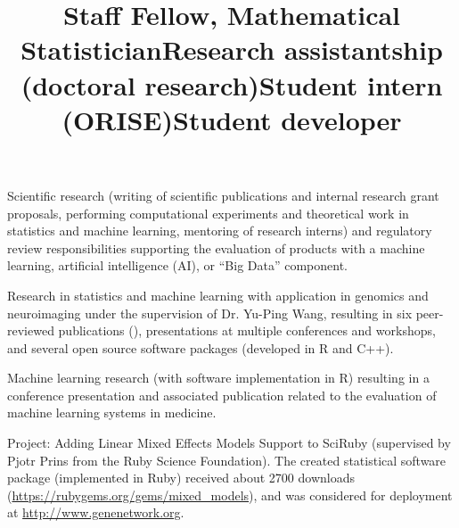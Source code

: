 \documentclass[overlapped, line, 10pt]{res} %
\begin{document}
\begin{resume}
\title{Staff Fellow, Mathematical Statistician}
\begin{position}
  Scientific research (writing of scientific publications and internal research grant proposals, performing computational experiments and theoretical work in statistics and machine learning, mentoring of research interns) and regulatory review responsibilities supporting the evaluation of products with a machine learning, artificial intelligence (AI), or ``Big Data'' component.
\end{position}

\title{Research assistantship (doctoral research)}
\begin{position}
  Research in statistics and machine learning with application in genomics and neuroimaging under the supervision of Dr. Yu-Ping Wang, resulting in six peer-reviewed publications (\cite{gossmann2015, cao2015BCB, cao2015bioinformatics, Gossmann2017-yu, Gossmann2017-ln, brzyski2016}), presentations at multiple conferences and workshops, and several open source software packages (developed in R and C++).
\end{position}

\title{Student intern (ORISE)}
\begin{position}
  Machine learning research (with software implementation in R) resulting in a conference presentation and associated publication \cite{gossmann2018} related to the evaluation of machine learning systems in medicine.
\end{position}

\title{Student developer}
\begin{position}
  Project: Adding Linear Mixed Effects Models Support to SciRuby (supervised by Pjotr Prins from the Ruby Science Foundation). The created statistical software package (implemented in Ruby) received about 2700 downloads (\url{https://rubygems.org/gems/mixed_models}), and was considered for deployment at \url{http://www.genenetwork.org}.
\end{position}


\end{resume}
\end{document}
